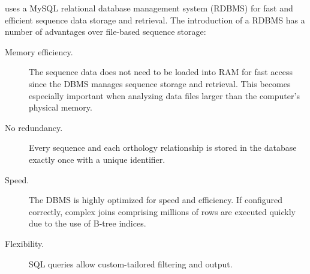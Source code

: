 \pname uses a MySQL relational database management system (RDBMS) for fast and
efficient sequence data storage and retrieval. The introduction of a RDBMS has a
number of advantages over file-based sequence storage:

\begin{description}
	\item[Memory efficiency.] The sequence data does not need to be loaded into
		RAM for fast access since the DBMS manages sequence storage and retrieval.
		This becomes especially important when analyzing data files larger than the
		computer's physical memory.
	\item[No redundancy.] Every sequence and each orthology relationship is stored
		in the database exactly once with a unique identifier. 
	\item[Speed.] The DBMS is highly optimized for speed and efficiency. If
		configured correctly, complex joins comprising millions of rows are
		executed quickly due to the use of B-tree indices.  %
	\item[Flexibility.] SQL queries allow custom-tailored filtering and output.
\end{description}


